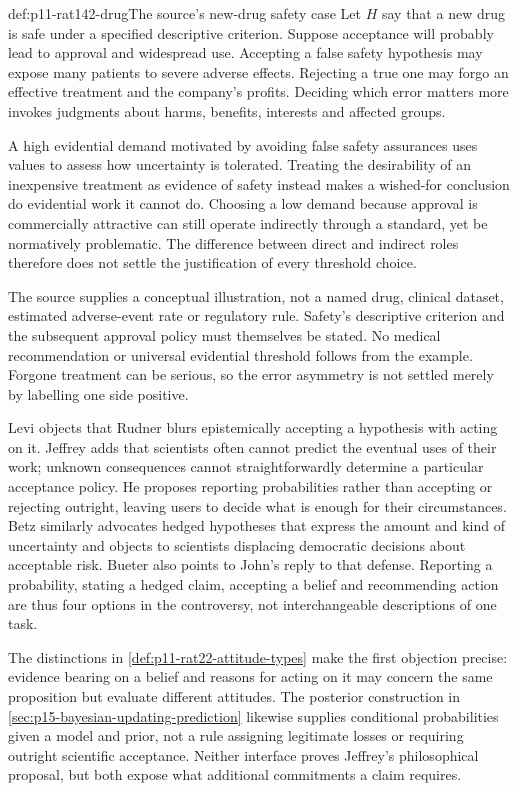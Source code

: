 \begin{hbexample}{def:p11-rat142-drug}{The source's new-drug safety case}
Let \(H\) say that a new drug is safe under a specified descriptive
criterion. Suppose acceptance will probably lead to approval and widespread
use. Accepting a false safety hypothesis may expose many patients to severe
adverse effects. Rejecting a true one may forgo an effective treatment and
the company's profits. Deciding which error matters more invokes judgments
about harms, benefits, interests and affected groups.

A high evidential demand motivated by avoiding false safety assurances
uses values to assess how uncertainty is tolerated. Treating the desirability
of an inexpensive treatment as evidence of safety instead makes a
wished-for conclusion do evidential work it cannot do. Choosing a low
demand because approval is commercially attractive can still operate
indirectly through a standard, yet be normatively problematic. The difference
between direct and indirect roles therefore does not settle the justification
of every threshold choice.

The source supplies a conceptual illustration, not a named drug, clinical
dataset, estimated adverse-event rate or regulatory rule. Safety's descriptive
criterion and the subsequent approval policy must themselves be stated.
No medical recommendation or universal evidential threshold follows from
the example. Forgone treatment can be serious, so the error asymmetry is
not settled merely by labelling one side positive.
\end{hbexample}

Levi objects that Rudner blurs epistemically accepting a hypothesis with
acting on it. Jeffrey adds that scientists often cannot predict the eventual
uses of their work; unknown consequences cannot straightforwardly determine
a particular acceptance policy. He proposes reporting probabilities rather
than accepting or rejecting outright, leaving users to decide what is
enough for their circumstances. Betz similarly advocates hedged hypotheses
that express the amount and kind of uncertainty and objects to scientists
displacing democratic decisions about acceptable risk. Bueter also points
to John's reply to that defense. Reporting a probability, stating a hedged
claim, accepting a belief and recommending action are thus four options
in the controversy, not interchangeable descriptions of one task.

The distinctions in \cref{def:p11-rat22-attitude-types} make the first
objection precise: evidence bearing on a belief and reasons for acting
on it may concern the same proposition but evaluate different attitudes.
The posterior construction in \cref{sec:p15-bayesian-updating-prediction}
likewise supplies conditional probabilities given a model and prior,
not a rule assigning legitimate losses or requiring outright scientific
acceptance. Neither interface proves Jeffrey's philosophical proposal,
but both expose what additional commitments a claim requires.

